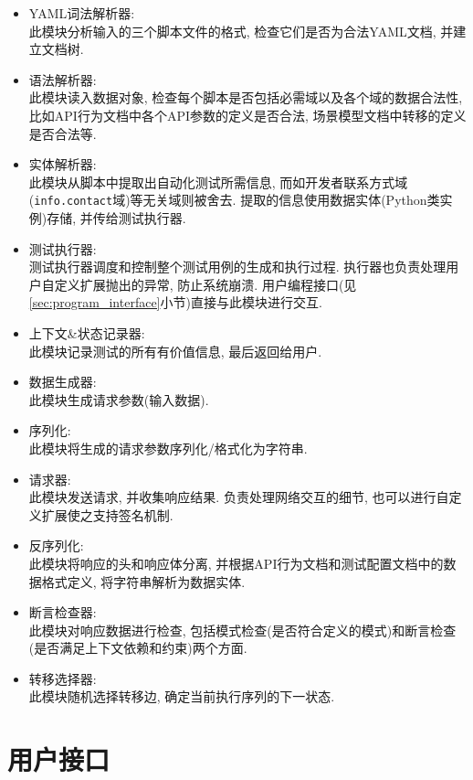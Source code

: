 	    \begin{itemize}
	        \item YAML词法解析器:\\
	            此模块分析输入的三个脚本文件的格式, 检查它们是否为合法YAML文档, 并建立文档树.
	        \item 语法解析器:\\
	            此模块读入数据对象, 检查每个脚本是否包括必需域以及各个域的数据合法性, 比如API行为文档中各个API参数的定义是否合法, 场景模型文档中转移的定义是否合法等.
	        \item 实体解析器:\\
	            此模块从脚本中提取出自动化测试所需信息, 而如开发者联系方式域(\texttt{info.contact}域)等无关域则被舍去. 提取的信息使用数据实体(Python类实例)存储, 并传给测试执行器.
	        \item 测试执行器:\\
	            测试执行器调度和控制整个测试用例的生成和执行过程. 执行器也负责处理用户自定义扩展抛出的异常, 防止系统崩溃. 用户编程接口(见\ref{sec:program_interface}小节)直接与此模块进行交互.
	        \item 上下文\&状态记录器:\\
	            此模块记录测试的所有有价值信息, 最后返回给用户.
	        \item 数据生成器:\\
	            此模块生成请求参数(输入数据).
	        \item 序列化:\\
	            此模块将生成的请求参数序列化/格式化为字符串.
	        \item 请求器:\\
	            此模块发送请求, 并收集响应结果. 负责处理网络交互的细节, 也可以进行自定义扩展使之支持签名机制.
	        \item 反序列化:\\
	            此模块将响应的头和响应体分离, 并根据API行为文档和测试配置文档中的数据格式定义, 将字符串解析为数据实体.
	        \item 断言检查器:\\
	            此模块对响应数据进行检查, 包括模式检查(是否符合定义的模式)和断言检查(是否满足上下文依赖和约束)两个方面.
	        \item 转移选择器:\\
	            此模块随机选择转移边, 确定当前执行序列的下一状态.
	    \end{itemize}

	\section{用户接口}
